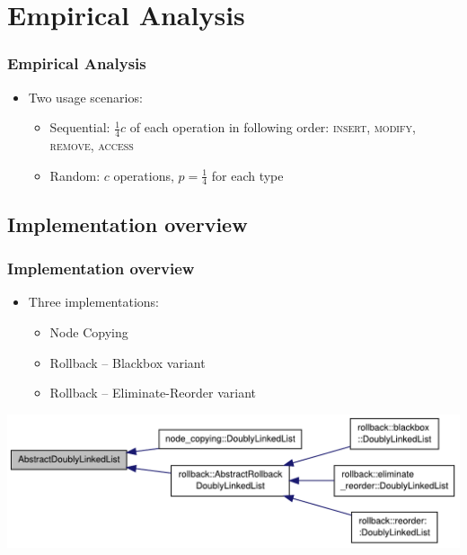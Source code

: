 \documentclass{beamer}
\begin{document}
\section{Empirical Analysis}

\begin{frame}
\frametitle{Empirical Analysis}
\begin{itemize}
  \item Two usage scenarios:
  \begin{itemize}

    \item Sequential: $\frac{1}{4}c$ of each operation in following
    order:\newline\hphantom{Sequential: } \textsc{insert}, \textsc{modify},
    \textsc{remove}, \textsc{access}

    \item Random: $c$ operations, $p=\frac{1}{4}$ for each type
  \end{itemize}

\end{itemize}
\end{frame}

\subsection{Implementation overview}

\begin{frame}
\frametitle{Implementation overview}
\begin{itemize}
  \item Three implementations:

  \begin{itemize}
    \item Node Copying
    \item Rollback -- Blackbox variant
    \item Rollback -- Eliminate-Reorder variant
  \end{itemize}
\end{itemize}
\includegraphics[width=\textwidth]{figures/classAbstractDoublyLinkedList__inherit__graph.pdf}
\end{frame}
\end{document}
